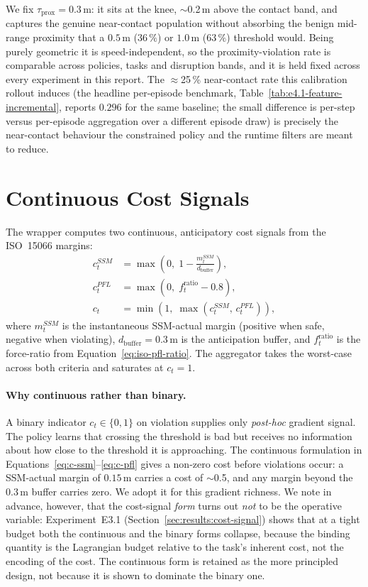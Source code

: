 \documentclass[11pt,a4paper]{report}
\newcommand{\ssm}{SSM}
\newcommand{\pfl}{PFL}
\newcommand{\iso}{ISO~15066}
\begin{document}
We fix $\tau_{\mathrm{prox}} = 0.3$\,m: it sits at the knee, $\sim$0.2\,m
above the contact band, and captures the genuine near-contact
population without absorbing the benign mid-range proximity that a
$0.5$\,m ($36\,\%$) or $1.0$\,m ($63\,\%$) threshold would. Being
purely geometric it is speed-independent, so the proximity-violation
rate is comparable across policies, tasks and disruption bands, and it
is held fixed across every experiment in this report. The
$\approx$25\,\% near-contact rate this calibration rollout induces (the
headline per-episode benchmark, Table~\ref{tab:e4.1-feature-incremental},
reports $0.296$ for the same baseline; the small difference is
per-step versus per-episode aggregation over a different episode draw)
is precisely the near-contact behaviour the constrained policy and the
runtime filters are meant to reduce.

\section{Continuous Cost Signals}
\label{sec:bench:cost}

The wrapper computes two continuous, anticipatory cost signals from
the \iso{} margins:
\begin{align}
  c^{\ssm}_t  &= \max\!\left(0,\; 1 - \frac{m^{\ssm}_t}{d_{\mathrm{buffer}}}\right),
    \label{eq:c-ssm} \\
  c^{\pfl}_t  &= \max\!\left(0,\; f^{\mathrm{ratio}}_t - 0.8\right),
    \label{eq:c-pfl} \\
  c_t         &= \min\!\left(1,\; \max(c^{\ssm}_t,\, c^{\pfl}_t)\right),
    \label{eq:c-total}
\end{align}
where $m^{\ssm}_t$ is the instantaneous \ssm{}-actual margin
(positive when safe, negative when violating), $d_{\mathrm{buffer}}
= 0.3$\,m is the anticipation buffer, and $f^{\mathrm{ratio}}_t$ is
the force-ratio from Equation~\ref{eq:iso-pfl-ratio}. The
aggregator takes the worst-case across both criteria and saturates
at $c_t = 1$.

\paragraph{Why continuous rather than binary.}
A binary indicator $c_t \in \{0,1\}$ on violation supplies only
\emph{post-hoc} gradient signal. The policy learns that crossing
the threshold is bad but receives no information about how close to
the threshold it is approaching. The continuous formulation in
Equations~\ref{eq:c-ssm}--\ref{eq:c-pfl} gives a non-zero cost
before violations occur: a \ssm{}-actual margin of $0.15$\,m carries
a cost of $\sim$0.5, and any margin beyond the $0.3$\,m buffer
carries zero. We adopt it for this gradient richness. We note in
advance, however, that the cost-signal \emph{form} turns out
\emph{not} to be the operative variable: Experiment~E3.1
(Section~\ref{sec:results:cost-signal}) shows that at a tight budget
both the continuous and the binary forms collapse, because the
binding quantity is the Lagrangian budget relative to the task's
inherent cost, not the encoding of the cost. The continuous form is
retained as the more principled design, not because it is shown to
dominate the binary one.
\end{document}
